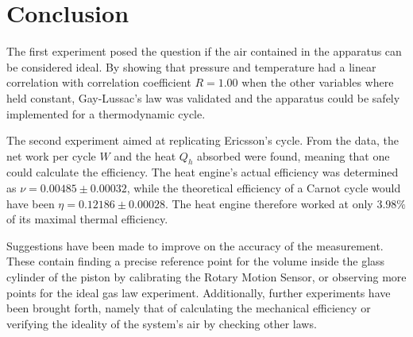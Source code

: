 \newpage
\section{Conclusion}
\label{Conclusion}

The first experiment posed the question if the air contained in the apparatus can be considered ideal. By showing that pressure and temperature had a linear correlation with correlation coefficient $\mathit{R=1.00}$ when the other variables where held constant, Gay-Lussac's law was validated and the apparatus could be safely implemented for a thermodynamic cycle. 

The second experiment aimed at replicating Ericsson's cycle. From the data, the net work per cycle $\mathit{W}$ and the heat $\mathit{Q_h}$ absorbed were found, meaning that one could calculate the efficiency. The heat engine's actual efficiency was determined as $\mathit{\nu = 0.00485 \pm 0.00032}$, while the theoretical efficiency of a Carnot cycle would have been $\mathit{\eta = 0.12186 \pm 0.00028}$. The heat engine therefore worked at only $\mathit{3.98 \%}$ of its maximal thermal efficiency. 

Suggestions have been made to improve on the accuracy of the measurement. These contain finding a precise reference point for the volume inside the glass cylinder of the piston by calibrating the Rotary Motion Sensor, or observing more points for the ideal gas law experiment. Additionally, further experiments have been brought forth, namely that of calculating the mechanical efficiency or verifying the ideality of the system's air by checking other laws. 